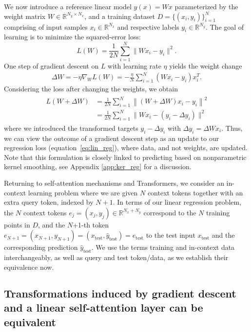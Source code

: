 \documentclass{article}
\def\eqref#1{equation~\ref{#1}}
\theoremstyle{plain}
\theoremstyle{definition}
\theoremstyle{remark}
\begin{document}
We now introduce a reference linear model $y(x) = W x$ parameterized by the weight matrix $W \in \mathbb{R}^{N_y \times N_x}$, and a training dataset $D = \{(x_i, y_i)\}_{i=1}^{N}$ comprising of input samples $x_i \in \mathbb{R}^{N_x}$ and respective labels $y_i \in \mathbb{R}^{N_y}$. The goal of learning is to minimize the squared-error loss:
\begin{equation}
\label{eq:lin_reg}
L(W) = \frac{1}{2N}\sum_{i=1}^{N} \|Wx_i - y_i\|^2. 
\end{equation}
One step of gradient descent on $L$ with learning rate $\eta$ yields the weight change
\begin{align}
\label{eq:gd_lin_reg}
    \Delta W = - \eta \nabla_W L(W) = - \frac{\eta}{N} \sum_{i=1}^{N}(Wx_i - y_i)x_i^T.
\end{align} Considering the loss after changing the weights, we obtain
\begin{align}
\begin{split}
\label{eq:lin_reg_changed}
L(W + \Delta W) &= \frac{1}{2N} \sum_{i=1}^{N}\left\|(W + \Delta W)x_i - y_i\right\|^2 \\

&= \frac{1}{2N} \sum_{i=1}^{N} \|Wx_i  - (y_i - \Delta y_i)\|^2 

\end{split}
\end{align}
where we introduced the transformed targets $y_i - \Delta y_i$ with $\Delta y_i = \Delta W x_i$. Thus, we can view the outcome of a gradient descent step as an update to our regression loss (\eqref{eq:lin_reg}), where data, and not weights, are updated. Note that this formulation is closely linked to predicting based on nonparametric kernel smoothing, see Appendix \ref{app:ker_reg} for a discussion.

Returning to self-attention mechanisms and Transformers, we consider an in-context learning problem where we are given $N$ context tokens together with an extra query token, indexed by $N+1$. In terms of our linear regression problem, the $N$ context tokens $e_j = (x_j, y_j) \in \mathbb{R}^{N_x+N_y}$ correspond to the $N$ training points in $D$, and the $N$+1-th token $e_{N+1} = (x_{N+1}, y_{N+1}) = (x_{\text{test}}, \hat{y}_{\text{test}}) = e_{\text{test}}$ to the test input $x_{\text{test}}$ and the corresponding
prediction $\hat{y}_{\text{test}}$. We use the terms training and in-context data interchangeably, as well as query and test token/data, as we establish their equivalence now. 

\subsection*{Transformations induced by gradient descent and a linear self-attention layer can be equivalent}
\end{document}

